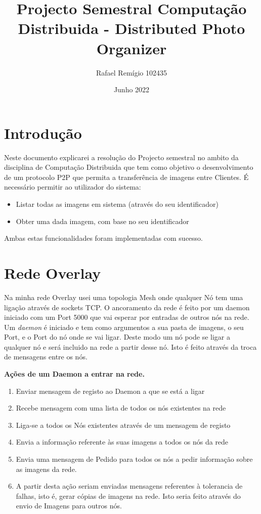 \documentclass[12pt, letterpaper, twoside]{article}
\title{Projecto Semestral Computação Distribuida - Distributed Photo Organizer}
\author{Rafael Remígio 102435}
\date{Junho 2022}
\begin{document}
	\maketitle
	\tableofcontents

	\section{Introdução}

Neste documento explicarei a resolução do Projecto semestral no ambito da disciplina de Computação Distribuida que tem como objetivo o desenvolvimento de um protocolo P2P que permita a transferência de imagens entre Clientes. É necessário permitir ao utilizador do sistema: 
\begin{itemize}
	\item Listar todas as imagens em sistema (através do seu identificador)
	\item Obter uma dada imagem, com base no seu identificador
\end{itemize}
Ambas estas funcionalidades foram implementadas com sucesso.

	\section{Rede Overlay}
	Na minha rede Overlay usei uma topologia Mesh onde qualquer Nó tem uma ligação através de sockets TCP. O ancoramento da rede é feito por um daemon iniciado com um Port 5000 que vai esperar por entradas de outros nós na rede. Um \emph{daemon} é iniciado e tem como argumentos a sua pasta de imagens, o seu Port, e o Port do nó onde se vai ligar. Deste modo um nó pode se ligar a qualquer nó e será incluido na rede a partir desse nó. Isto é feito através da troca de mensagens entre os nós.
	
	
\noindent 	\textbf{Ações de um Daemon a entrar na rede.} 
\begin{enumerate}
	\item Enviar mensagem de registo ao Daemon a que se está a ligar
	\item Recebe mensagem com uma lista de todos os nós existentes na rede
	\item Liga-se a todos os Nós existentes através de um mensagem de registo 
	\item Envia a informação referente às suas imagens a todos os nós da rede
	\item Envia uma mensagem de Pedido para todos os nós a pedir informação sobre as imagens da rede.
	\item A partir desta ação seriam enviadas mensagens referentes à tolerancia de falhas, isto é, gerar cópias de imagens na rede. Isto seria feito através do envio de Imagens para outros nós.
\end{enumerate}
\end{document}
